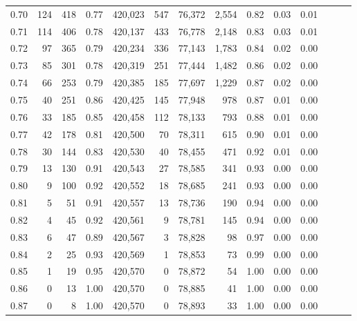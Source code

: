 \begin{tabular}{rrrrrrrrrrrrrr}
0.70 &     124 &    418 &  0.77 &  420,023 &      547 &  76,372 &   2,554 &  0.82 &  0.03 &      0.01 \\
0.71 &     114 &    406 &  0.78 &  420,137 &      433 &  76,778 &   2,148 &  0.83 &  0.03 &      0.01 \\
0.72 &      97 &    365 &  0.79 &  420,234 &      336 &  77,143 &   1,783 &  0.84 &  0.02 &      0.00 \\
0.73 &      85 &    301 &  0.78 &  420,319 &      251 &  77,444 &   1,482 &  0.86 &  0.02 &      0.00 \\
0.74 &      66 &    253 &  0.79 &  420,385 &      185 &  77,697 &   1,229 &  0.87 &  0.02 &      0.00 \\
0.75 &      40 &    251 &  0.86 &  420,425 &      145 &  77,948 &     978 &  0.87 &  0.01 &      0.00 \\
0.76 &      33 &    185 &  0.85 &  420,458 &      112 &  78,133 &     793 &  0.88 &  0.01 &      0.00 \\
0.77 &      42 &    178 &  0.81 &  420,500 &       70 &  78,311 &     615 &  0.90 &  0.01 &      0.00 \\
0.78 &      30 &    144 &  0.83 &  420,530 &       40 &  78,455 &     471 &  0.92 &  0.01 &      0.00 \\
0.79 &      13 &    130 &  0.91 &  420,543 &       27 &  78,585 &     341 &  0.93 &  0.00 &      0.00 \\
0.80 &       9 &    100 &  0.92 &  420,552 &       18 &  78,685 &     241 &  0.93 &  0.00 &      0.00 \\
0.81 &       5 &     51 &  0.91 &  420,557 &       13 &  78,736 &     190 &  0.94 &  0.00 &      0.00 \\
0.82 &       4 &     45 &  0.92 &  420,561 &        9 &  78,781 &     145 &  0.94 &  0.00 &      0.00 \\
0.83 &       6 &     47 &  0.89 &  420,567 &        3 &  78,828 &      98 &  0.97 &  0.00 &      0.00 \\
0.84 &       2 &     25 &  0.93 &  420,569 &        1 &  78,853 &      73 &  0.99 &  0.00 &      0.00 \\
0.85 &       1 &     19 &  0.95 &  420,570 &        0 &  78,872 &      54 &  1.00 &  0.00 &      0.00 \\
0.86 &       0 &     13 &  1.00 &  420,570 &        0 &  78,885 &      41 &  1.00 &  0.00 &      0.00 \\
0.87 &       0 &      8 &  1.00 &  420,570 &        0 &  78,893 &      33 &  1.00 &  0.00 &      0.00 \\

\end{tabular}
